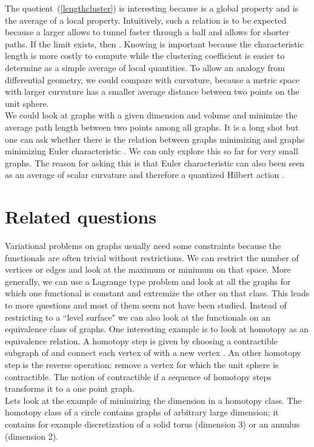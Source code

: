 \documentclass[12pt]{amsart}
\theoremstyle{definition}
\begin{document}
The quotient~(\ref{lengthcluster}) is interesting because 
 is a global property and  is the average of a local property. 
Intuitively, such a relation is to be expected because a larger  allows to tunnel 
faster through a ball  and allows for shorter paths. If the limit exists, 
then .  
Knowing  is important because the characteristic length is more costly to compute 
while the clustering coefficient  is easier to determine as a simple average 
of local quantities. 
To allow an analogy from differential geometry, we could compare  with curvature, because a 
metric space with larger curvature has a smaller 
average distance between two points on the unit sphere.  \\

We could look at graphs with a given dimension and volume and minimize the average path
length between two points among all graphs. It is a long shot but one can ask
whether there is the relation between graphs minimizing  and 
graphs minimizing Euler characteristic . We can only explore this so far for very 
small graphs. The reason for asking this is that Euler characteristic can also been seen 
as an average of scalar curvature and therefore a quantized Hilbert action 
\cite{eveneuler}.

\section{Related questions}

Variational problems on graphs usually need some constraints because  the functionals are often
trivial without restrictions. We can restrict the 
number of vertices or edges and look at the maximum or minimum on that space. 
More generally, we can use a Lagrange type problem and look at all the graphs for which one
functional is constant and extremize the other on that class. This leads to more
questions and most of them seem not have been studied. Instead of restricting to a ``level surface"
we can also look at the functionals on an equivalence class of graphs. One interesting 
example is to look at homotopy as an equivalence relation. A homotopy step  is given by
choosing a contractible subgraph  of   and connect each vertex of  with a new vertex .
An other homotopy step is the reverse operation: remove a vertex for which the unit sphere is 
contractible. The notion of contractible if a sequence of homotopy steps transforms it to a one
point graph.  \\

Lets look at the example of minimizing the dimension  in a homotopy class. The 
homotopy class of a circle contains  graphs of arbitrary 
large dimension; it contains for example
discretization of a solid torus (dimension 3) or an annulus (dimension 2). \\
\end{document}
